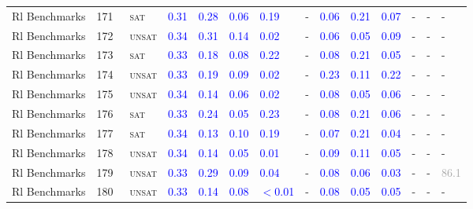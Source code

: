\begin{center}
{\begin{longtable}{@{}llllllllllllll@{}}
Rl Benchmarks & 171 & ~\textsc{sat} & \textcolor{blue}{0.31} & \textcolor{blue}{0.28} & \textcolor{blue}{0.06} & \textcolor{blue}{0.19} & - & \textcolor{blue}{0.06} & \textcolor{blue}{0.21} & \textcolor{blue}{0.07} & - & - & - \\
Rl Benchmarks & 172 & ~\textsc{unsat} & \textcolor{blue}{0.34} & \textcolor{blue}{0.31} & \textcolor{blue}{0.14} & \textcolor{blue}{0.02} & - & \textcolor{blue}{0.06} & \textcolor{blue}{0.05} & \textcolor{blue}{0.09} & - & - & - \\
Rl Benchmarks & 173 & ~\textsc{sat} & \textcolor{blue}{0.33} & \textcolor{blue}{0.18} & \textcolor{blue}{0.08} & \textcolor{blue}{0.22} & - & \textcolor{blue}{0.08} & \textcolor{blue}{0.21} & \textcolor{blue}{0.05} & - & - & - \\
Rl Benchmarks & 174 & ~\textsc{unsat} & \textcolor{blue}{0.33} & \textcolor{blue}{0.19} & \textcolor{blue}{0.09} & \textcolor{blue}{0.02} & - & \textcolor{blue}{0.23} & \textcolor{blue}{0.11} & \textcolor{blue}{0.22} & - & - & - \\
Rl Benchmarks & 175 & ~\textsc{unsat} & \textcolor{blue}{0.34} & \textcolor{blue}{0.14} & \textcolor{blue}{0.06} & \textcolor{blue}{0.02} & - & \textcolor{blue}{0.08} & \textcolor{blue}{0.05} & \textcolor{blue}{0.06} & - & - & - \\
Rl Benchmarks & 176 & ~\textsc{sat} & \textcolor{blue}{0.33} & \textcolor{blue}{0.24} & \textcolor{blue}{0.05} & \textcolor{blue}{0.23} & - & \textcolor{blue}{0.08} & \textcolor{blue}{0.21} & \textcolor{blue}{0.06} & - & - & - \\
Rl Benchmarks & 177 & ~\textsc{sat} & \textcolor{blue}{0.34} & \textcolor{blue}{0.13} & \textcolor{blue}{0.10} & \textcolor{blue}{0.19} & - & \textcolor{blue}{0.07} & \textcolor{blue}{0.21} & \textcolor{blue}{0.04} & - & - & - \\
Rl Benchmarks & 178 & ~\textsc{unsat} & \textcolor{blue}{0.34} & \textcolor{blue}{0.14} & \textcolor{blue}{0.05} & \textcolor{blue}{0.01} & - & \textcolor{blue}{0.09} & \textcolor{blue}{0.11} & \textcolor{blue}{0.05} & - & - & - \\
Rl Benchmarks & 179 & ~\textsc{unsat} & \textcolor{blue}{0.33} & \textcolor{blue}{0.29} & \textcolor{blue}{0.09} & \textcolor{blue}{0.04} & - & \textcolor{blue}{0.08} & \textcolor{blue}{0.06} & \textcolor{blue}{0.03} & - & - & \textcolor{darkgray}{86.1} \\
Rl Benchmarks & 180 & ~\textsc{unsat} & \textcolor{blue}{0.33} & \textcolor{blue}{0.14} & \textcolor{blue}{0.08} & \textcolor{blue}{$<$0.01} & - & \textcolor{blue}{0.08} & \textcolor{blue}{0.05} & \textcolor{blue}{0.05} & - & - & - \\

\end{longtable}}
\end{center}
